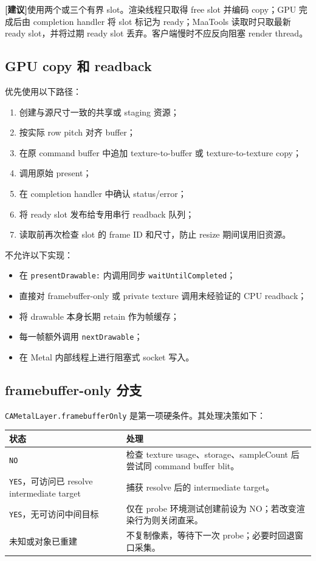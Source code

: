 \documentclass[UTF8,a4paper,11pt]{ctexart}
\newcommand{\recommend}{\textbf{\color{recommend}[建议]}}
\begin{document}
\recommend{}使用两个或三个有界 slot。渲染线程只取得 free slot 并编码 copy；GPU 完成后由 completion handler 将 slot 标记为 ready；MaaTools 读取时只取最新 ready slot，并将过期 ready slot 丢弃。客户端慢时不应反向阻塞 render thread。

\subsection{GPU copy 和 readback}

优先使用以下路径：

\begin{enumerate}
  \item 创建与源尺寸一致的共享或 staging 资源；
  \item 按实际 row pitch 对齐 buffer；
  \item 在原 command buffer 中追加 texture-to-buffer 或 texture-to-texture copy；
  \item 调用原始 present；
  \item 在 completion handler 中确认 status/error；
  \item 将 ready slot 发布给专用串行 readback 队列；
  \item 读取前再次检查 slot 的 frame ID 和尺寸，防止 resize 期间误用旧资源。
\end{enumerate}

不允许以下实现：

\begin{itemize}
  \item 在 \texttt{presentDrawable:} 内调用同步 \texttt{waitUntilCompleted}；
  \item 直接对 framebuffer-only 或 private texture 调用未经验证的 CPU readback；
  \item 将 drawable 本身长期 retain 作为帧缓存；
  \item 每一帧额外调用 \texttt{nextDrawable}；
  \item 在 Metal 内部线程上进行阻塞式 socket 写入。
\end{itemize}

\subsection{framebuffer-only 分支}

\texttt{CAMetalLayer.framebufferOnly} 是第一项硬条件。其处理决策如下：

\begin{center}
\small
\begin{tabularx}{\textwidth}{>{\ttfamily}p{} X}
\toprule
状态 & 处理 \\
\midrule
\texttt{NO} & 检查 texture usage、storage、sampleCount 后尝试同 command buffer blit。\\
\texttt{YES}，可访问已 resolve intermediate target & 捕获 resolve 后的 intermediate target。\\
\texttt{YES}，无可访问中间目标 & 仅在 probe 环境测试创建前设为 NO；若改变渲染行为则关闭直采。\\
未知或对象已重建 & 不复制像素，等待下一次 probe；必要时回退窗口采集。\\
\bottomrule
\end{tabularx}
\end{center}
\end{document}
